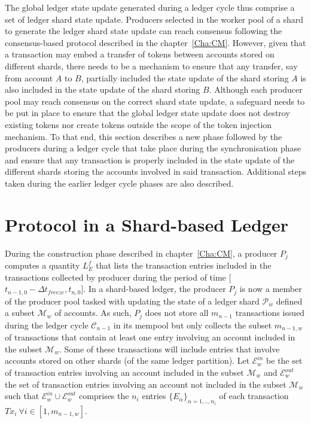 The global ledger state update generated during a ledger cycle thus comprise a set of ledger shard state update. Producers selected in the worker pool of a shard to generate the ledger shard state update can reach consensus following the consensus-based protocol described in the chapter~\ref{Cha:CM}. However, given that a transaction may embed a transfer of tokens between accounts stored on different shards, there needs to be a mechanism to ensure that any transfer, say from account $A$ to $B$, partially included the state update of the shard storing $A$ is also included in the state update of the shard storing $B$. Although each producer pool may reach consensus on the correct shard state update, a safeguard needs to be put in place to ensure that the global ledger state update does not destroy existing tokens nor create tokens outside the scope of the token injection mechanism. To that end, this section describes a new phase followed by the producers during a ledger cycle that take place during the synchronisation phase and ensure that any transaction is properly included in the state update of the different shards storing the accounts involved in said transaction.  Additional steps taken during the earlier ledger cycle phases are also described.

\section{Protocol in a Shard-based Ledger}

During the construction phase described in chapter~\ref{Cha:CM}, a producer $P_j$ computes a quantity $L_E^f$ that lists the transaction entries included in the transactions collected by producer during the period of time [$t_{n-1,0} - \Delta t_{freeze}, t_{n,0}$]. In a shard-based ledger, the producer $P_j$ is now a member of the producer pool tasked with updating the state of a ledger shard $\mathcal{P}_w$ defined a subset $\mathcal{M}_w$ of accounts. As such, $P_j$ does not store all $m_{n-1}$ transactions issued during the ledger cycle $\mathcal{C}_{n-1}$ in its mempool but only collects the subset $m_{n-1,w}$ of transactions that contain at least one entry involving  an account included in the subset $\mathcal{M}_w$. Some of these transactions will include entries that involve accounts stored on other shards (of the same ledger partition). Let $\mathcal{E}^{in}_w$ be the set of transaction entries involving an account included in the subset $\mathcal{M}_w$ and $\mathcal{E}^{out}_w$ the set of transaction entries involving  an account not included in the subset $\mathcal{M}_w$ such that $\mathcal{E}^{in}_w \cup \mathcal{E}^{out}_w$ comprises the $n_i$ entries $\{E_\alpha\}_{\alpha=1,..,n_i}$ of each transaction $Tx_i~\forall i \in  [1, m_{n-1,w}]$.\\


